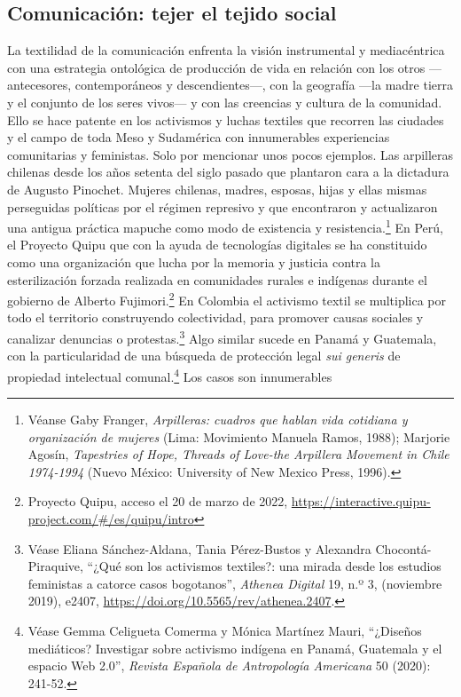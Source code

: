 \documentclass{tufte-handout}
\begin{document}
\hypertarget{comunicacin-tejer-el-tejido-social}{%
\subsection{Comunicación: tejer el tejido
social}\label{comunicacin-tejer-el-tejido-social}}

La textilidad de la comunicación enfrenta la visión instrumental y
mediacéntrica con una estrategia ontológica de producción de vida en
relación con los otros ---antecesores, contemporáneos y
descendientes---, con la geografía ---la madre tierra y el conjunto de
los seres vivos--- y con las creencias y cultura de la comunidad. Ello
se hace patente en los activismos y luchas textiles que recorren las
ciudades y el campo de toda Meso y Sudamérica con innumerables
experiencias comunitarias y feministas. Solo por mencionar unos pocos
ejemplos. Las arpilleras chilenas desde los años setenta del siglo
pasado que plantaron cara a la dictadura de Augusto Pinochet. Mujeres
chilenas, madres, esposas, hijas y ellas mismas perseguidas políticas
por el régimen represivo y que encontraron y actualizaron una antigua
práctica mapuche como modo de existencia y resistencia.\footnote{Véanse
  Gaby Franger, \emph{Arpilleras: cuadros que hablan vida cotidiana y
  organización de mujeres} (Lima: Movimiento Manuela Ramos, 1988);
  Marjorie Agosín, \emph{Tapestries of Hope, Threads of Love-the
  Arpillera Movement in Chile 1974-1994} (Nuevo México: University of
  New Mexico Press, 1996).} En Perú, el Proyecto Quipu que con la ayuda
de tecnologías digitales se ha constituido como una organización que
lucha por la memoria y justicia contra la esterilización forzada
realizada en comunidades rurales e indígenas durante el gobierno de
Alberto Fujimori.\footnote{Proyecto Quipu, acceso el 20 de marzo de
  2022, \url{https://interactive.quipu-project.com/\#/es/quipu/intro}}
En Colombia el activismo textil se multiplica por todo el territorio
construyendo colectividad, para promover causas sociales y canalizar
denuncias o protestas.\footnote{Véase Eliana Sánchez-Aldana, Tania
  Pérez-Bustos y Alexandra Chocontá-Piraquive, ``¿Qué son los activismos
  textiles?: una mirada desde los estudios feministas a catorce casos
  bogotanos'', \emph{Athenea Digital} 19, n.º 3, (noviembre 2019),
  e2407, \url{https://doi.org/10.5565/rev/athenea.2407}.} Algo similar
sucede en Panamá y Guatemala, con la particularidad de una búsqueda de
protección legal \emph{sui generis} de propiedad intelectual
comunal.\footnote{Véase Gemma Celigueta Comerma y Mónica Martínez Mauri,
  ``¿Diseños mediáticos? Investigar sobre activismo indígena en Panamá,
  Guatemala y el espacio Web 2.0'', \emph{Revista Española de
  Antropología Americana} 50 (2020): 241-52.} Los casos son innumerables
\end{document}

